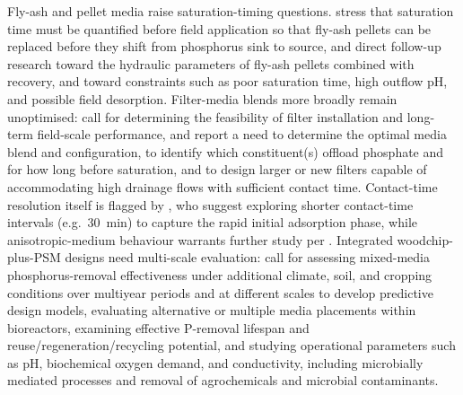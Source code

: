 \documentclass[11pt]{article}
\begin{document}
Fly-ash and pellet media raise saturation-timing questions. \textcite{Li2017} stress that saturation time must be quantified before field application so that fly-ash pellets can be replaced before they shift from phosphorus sink to source, and \textcite{Li2018b} direct follow-up research toward the hydraulic parameters of fly-ash pellets combined with recovery, and toward constraints such as poor saturation time, high outflow pH, and possible field desorption. Filter-media blends more broadly remain unoptimised: \textcite{Agrawal2011} call for determining the feasibility of filter installation and long-term field-scale performance, and \textcite{Agrawal2011b} report a need to determine the optimal media blend and configuration, to identify which constituent(s) offload phosphate and for how long before saturation, and to design larger or new filters capable of accommodating high drainage flows with sufficient contact time. Contact-time resolution itself is flagged by \textcite{Kumari2025}, who suggest exploring shorter contact-time intervals (e.g.\ 30~min) to capture the rapid initial adsorption phase, while anisotropic-medium behaviour warrants further study per \textcite{Kankarej2023}. Integrated woodchip-plus-PSM designs need multi-scale evaluation: \textcite{Husk2018} call for assessing mixed-media phosphorus-removal effectiveness under additional climate, soil, and cropping conditions over multiyear periods and at different scales to develop predictive design models, evaluating alternative or multiple media placements within bioreactors, examining effective P-removal lifespan and reuse/regeneration/recycling potential, and studying operational parameters such as pH, biochemical oxygen demand, and conductivity, including microbially mediated processes and removal of agrochemicals and microbial contaminants.
\end{document}
